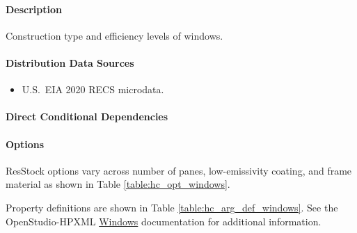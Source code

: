 \paragraph{Description}
% 
Construction type and efficiency levels of windows.

\paragraph{Distribution Data Sources}
% 
\begin{itemize}

\item
  U.S.~EIA 2020 RECS microdata.
\end{itemize}

\paragraph{Direct Conditional Dependencies}


\paragraph{Options}
ResStock options vary across number of panes, low-emissivity coating, and frame material as shown in Table \ref{table:hc_opt_windows}.



Property definitions are shown in Table \ref{table:hc_arg_def_windows}. See the OpenStudio-HPXML \href{https://openstudio-hpxml.readthedocs.io/en/v1.10.0/workflow_inputs.html#hpxml-windows}{Windows} documentation for additional information.



